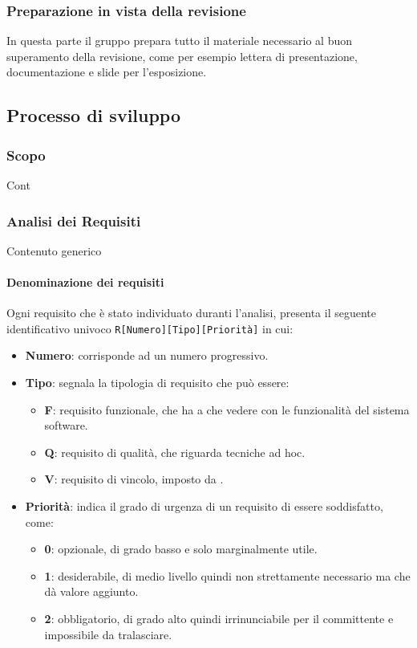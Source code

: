         \subsubsection{Preparazione in vista della revisione}
        In questa parte il gruppo prepara tutto il materiale necessario al buon superamento della revisione, come per esempio lettera di presentazione, documentazione e slide per l'esposizione.


    \subsection{Processo di sviluppo}\label{PP:Sviluppo}

        \subsubsection{Scopo}\label{PP:Sviluppo:Scopo}
        Cont


        \subsubsection{Analisi dei Requisiti}\label{PP:Sviluppo:AdR}
        Contenuto generico



		 \paragraph{Denominazione dei requisiti}\label{PP:Sviluppo:AdR:DenominazioneRequisiti}
		 Ogni requisito che è stato individuato duranti l'analisi, presenta il seguente identificativo univoco \texttt{R[Numero][Tipo][Priorità]} in cui:
		 \begin{itemize}
		 	\item \textbf{Numero}: corrisponde ad un numero progressivo.
		 	\item \textbf{Tipo}: segnala la tipologia di requisito che può essere:
		 	\begin{itemize}
		 		\item \textbf{F}: requisito funzionale, che ha a che vedere con le funzionalità del sistema software.
		 		\item \textbf{Q}: requisito di qualità, che riguarda tecniche ad hoc.
		 		\item \textbf{V}: requisito di vincolo, imposto da \II.
		 	\end{itemize}
	 		\item \textbf{Priorità}: indica il grado di urgenza di un requisito di essere soddisfatto, come:
	 		\begin{itemize}
	 			\item \textbf{0}: opzionale, di grado basso e solo marginalmente utile.
	 			\item \textbf{1}: desiderabile, di medio livello quindi non strettamente necessario ma che dà valore aggiunto.
	 			\item \textbf{2}: obbligatorio, di grado alto quindi irrinunciabile per il committente e impossibile da tralasciare.
	 		\end{itemize}
		 \end{itemize}


